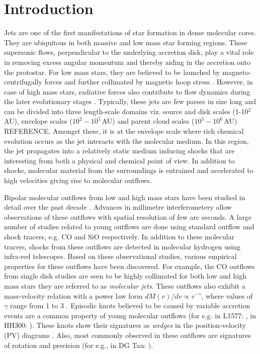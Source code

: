 \documentclass[useAMS,usenatbib,letters]{mn2e}
\newcommand{\refer}{{\color{orange}REFERENCE}}
\begin{document}
%
%


\section{Introduction}
Jets are one of the first manifestations of star
formation in dense molecular cores. They are ubiquitous in both
massive and low mass star forming regions. These supersonic flows,
perpendicular to the underlying accretion disk, play a vital role in
removing excess angular momentum and thereby aiding in the accretion onto the protostar. 
For low mass stars, they are believed to be launched by magneto-centrifugally forces and
further collimated by magnetic hoop stress
\citep[][]{Blandford:1982p892, Konigl:2000p607}. However, in case of
high mass stars, radiative forces also contribute to flow dynamics
during the later evolutionary stages \cite{Vaidya:2011p8992}. 
Typically, these jets are few parsec in size long and can be divided into
three length-scale domains viz. source and disk scales (1-10$^{2}\,$AU),
envelope scales ($10^{2} - 10^{5}$\,AU) and parent cloud scales
($10^{5} - 10^{6}$\,AU) \refer. Amongst these, it is at the envelope scale where rich chemical evolution occurs as the jet interacts
with the molecular medium. In this region, the jet propagates into a
relatively static medium inducing shocks that are interesting from both a
physical and chemical point of view. In addition to shocks, molecular
material from the surroundings is entrained and accelerated to high
velocities giving rise to molecular outflows.
%

Bipolar molecular outflows from low and high mass stars
have been studied in detail over the past 
decade \citep[see reviews by][]{Bachiller:1996p4692,Arce:2007p798,
Tafalla:2011p14051}. Advances in millimetre interferometery 
allow observations of these outflows with spatial resolution of
few arc seconds. A large number of studies related to young
outflows are done using standard outflow and shock tracers,
e.g. CO and SiO respectively. In addition to these molecular tracers,
shocks from these outflows are detected in molecular hydrogen using
infra-red telescopes. Based on these observational studies, various
empirical properties for these outflows have been discovered. For
example, the CO outflows from single dish studies are seen to be
highly collimated for both low and high mass stars
\citep[for e.g.,][]{Gueth:1999p4683, Beuther:2002p3574} they are
referred to as {\em{molecular jets}}. These outflows also exhibit a
mass-velocity relation with a power law form $ dM(v)/dv \propto
v^{-\gamma}$, where values of $\gamma$ range from 1 to 3 \cite{Downes:2003p9946}. Episodic
knots believed to be caused by variable accretion events are a common property
of young molecular outflows (for e.g. in L1577:
\citealt{Gueth:1998p14058}, in HH300: \citealt{Arce:2001p14064}). These knots show their signatures
as {\em{wedges}} in the position-velocity (PV) diagrams \cite{Arce:2001p14065}. Also, most
commonly observed in these outflows are signatures of rotation and
precision (for e.g., in DG Tau: \citealt{Bacciotti:2002p2084}).
%
\end{document}
